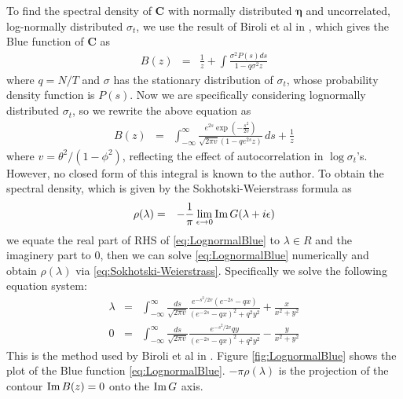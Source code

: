 \documentclass{article}
\begin{document}
To find the spectral density of $\bm C$ with normally distributed $\bm
\eta$ and uncorrelated, log-normally distributed $\sigma_t$, we use
the result of Biroli et al in \cite{biroli2007student}, which gives
the Blue function of $\bm C$ as
\begin{eqnarray*}
  B(z) &=& \frac{1}{z} + \int \frac{\sigma ^2 P(s) ds}{1-q \sigma ^2 z}
\end{eqnarray*}
where $q = N/T$ and $\sigma$ has the stationary distribution of
$\sigma_t$, whose probability density function is $P(s)$. Now we are
specifically considering lognormally distributed $\sigma_t$, so we
rewrite the above equation as
\begin{eqnarray}
B(z) &=& \int_{-\infty }^{\infty } \frac{e^{2 s} \exp \left(-\frac{s^2}{2
      v}\right)}{\sqrt{2 \pi  v} \left(1-q e^{2 s} z\right)} \,
ds+\frac{1}{z} \label{eq:LognormalBlue}
\end{eqnarray}
where $v = \theta^2/(1 - \phi^2)$, reflecting the effect
of autocorrelation in $\log \sigma_t$'s. However, no closed form of
this integral is known to the author. To obtain the spectral density,
which is given by the Sokhotski-Weierstrass formula as
\begin{eqnarray}
  \rho(\lambda) &=& -{1 \over \pi} \lim_{\epsilon \to 0} \text{Im}\, G(\lambda +
  i\epsilon) \label{eq:Sokhotski-Weierstrass}
\end{eqnarray}
we equate the real part of RHS of \eqref{eq:LognormalBlue} to $\lambda \in
R$ and the imaginery part to 0, then we can solve \eqref{eq:LognormalBlue}
numerically and obtain $\rho(\lambda)$ via
\eqref{eq:Sokhotski-Weierstrass}. Specifically we solve the following
equation system:
\begin{eqnarray}
\lambda &=& \int_{-\infty}^{\infty} \frac{ds}{\sqrt{2\pi v}}
\frac{
  e^{-s^2/2v}(e^{-2s} - qx)
}{
  (e^{-2s} - qx)^2 + q^2 y^2  
} +
\frac{x}{x^2 + y^2} \label{eq:LognormalBlueReal}\\
0 &=& \int_{-\infty}^{\infty} \frac{ds}{\sqrt{2\pi v}}
\frac{
  e^{-s^2/2v} q y
}{
  (e^{-2s} - qx)^2 + q^2 y^2  
} -
\frac{y}{x^2 + y^2} \label{eq:LognormalBlueImag}
\end{eqnarray}
This is the method used by Biroli et al in
\cite{biroli2007student}. Figure \ref{fig:LognormalBlue}
shows the plot of the Blue function \eqref{eq:LognormalBlue}. $-\pi
\rho(\lambda)$ is the projection of the contour $\text{Im}\, B(z) = 0$ onto the $\text{Im}\,
G$ axis.
\end{document}
